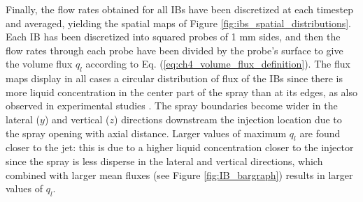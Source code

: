 Finally, the flow rates obtained for all IBs have been discretized at each timestep and averaged, yielding the spatial maps of Figure \ref{fig:ibs_spatial_distributions}. Each IB has been discretized into squared probes of 1 mm sides, and then the flow rates through each probe have been divided by the probe's surface to give the volume flux $q_l$ according to Eq. (\ref{eq:ch4_volume_flux_definition}). The flux maps display in all cases a circular distribution of flux of the IBs since there is more liquid concentration in the center part of the spray than at its edges, as also observed in experimental studies .  The spray boundaries become wider in the lateral ($y$) and vertical ($z$) directions downstream the injection location due to the spray opening with axial distance. Larger values of maximum $q_l$ are found closer to the jet: this is due to a higher liquid concentration closer to the injector since the spray is less disperse in the lateral and vertical directions, which combined with larger mean fluxes (see Figure \ref{fig:IB_bargraph}) results in larger values of $q_l$. 

